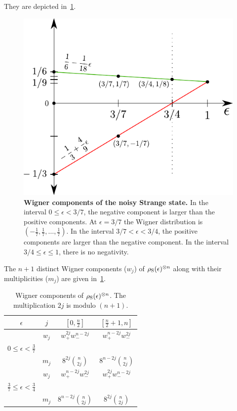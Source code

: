 They are depicted in~\cref{fig:noisys}.
\begin{figure}[t]
    \centering
    \includegraphics[scale=0.7]{figs/noisys.pdf}
    \caption{\textbf{Wigner components of the noisy Strange state.} 
    In the interval $0 \leq \epsilon < 3/7$, the negative component is larger than the positive components.
    At $\epsilon = 3/7$ the Wigner distribution is $(-\frac{1}{7},\frac{1}{7},\dots,\frac{1}{7})$.
    In the interval $3/7 < \epsilon < 3/4$, the positive components are larger than the negative component.
    In the interval $3/4 \leq \epsilon \leq 1$, there is no negativity.
    }
    \label{fig:noisys}
\end{figure}
The $n+1$ distinct Wigner components ($w_j$) of $\rho_{\rm{S}}(\epsilon)^{\otimes n}$ along with their multiplicities ($m_j$) are given in~\cref{tab:lcsu_w}.
\begin{table}[b]                           
 \centering
 \begin{tabular}{c|c|c|c}
 $\epsilon$ & $j$ & $\left[0, \frac{n}{2}\right]$ & $\left[\frac{n}{2} + 1, n \right]$ \\ [0.5ex] 
 \hline
  & $w_{j}$ & $w_+^{2j}w_-^{n-2j}$ & $w_+^{n-2j}w_-^{2j}$  \\
  $0\leq \epsilon < \frac{3}{7}$ & & & \\
  & $m_{j}$ & $8^{2j}\binom{n}{2j}$ & $8^{n-2j}\binom{n}{2j}$ \\
 \hline
  & $w_{j}$ & $w_+^{n-2j}w_-^{2j}$ & $w_+^{2j}w_-^{n-2j}$  \\
  $\frac{3}{7} \leq \epsilon < \frac{3}{4} $ & & & \\
  & $m_{j}$ & $8^{n-2j}\binom{n}{2j}$ & $8^{2j}\binom{n}{2j}$
\end{tabular}
 \caption{Wigner components of $\rho_{\rm{S}}(\epsilon)^{\otimes n}$. The multiplication $2j$ is modulo $(n+1)$.}
 \label{tab:lcsu_w}
\end{table}



